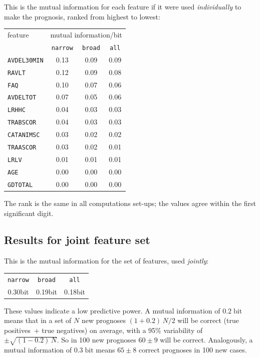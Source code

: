 \documentclass[\ifafour a4paper,12pt,\else a5paper,10pt,\fi%
onecolumn,oneside,article,%
british%
]{memoir}
\theoremstyle{remark}
\theoremstyle{innote}
\renewcommand*{\|}[1][]{\nonscript\:#1\vert\nonscript\:\mathopen{}}
\newcommand*{\bit}{\textrm{bit}}
\newcommand*{\narrow}{\texttt{narrow}}
\newcommand*{\broad}{\texttt{broad}}
\newcommand*{\all}{\texttt{all}}
\begin{document}
This is the mutual information for each feature if it were used
\emph{individually} to make the prognosis, ranked
from highest to lowest:
\begin{center}
  \begin{tabular}[c]{l|ccc}
    feature &\multicolumn{3}{c}{mutual information/bit} \\
    & \narrow & \broad & \all \\
\hline
    \texttt{AVDEL30MIN} & 0.13 & 0.09 & 0.09\\
    \texttt{RAVLT} & 0.12 & 0.09 & 0.08\\
    \texttt{FAQ} & 0.10 & 0.07 & 0.06\\
    \texttt{AVDELTOT} & 0.07 & 0.05 & 0.06\\
    \texttt{LRHHC} & 0.04 & 0.03 & 0.03\\
    \texttt{TRABSCOR} & 0.04 & 0.03 & 0.03\\
    \texttt{CATANIMSC} & 0.03 & 0.02 & 0.02\\
    \texttt{TRAASCOR} & 0.03 & 0.02 & 0.01\\
    \texttt{LRLV} & 0.01 & 0.01 & 0.01\\
    \texttt{AGE} & 0.00 & 0.00 & 0.00\\
    \texttt{GDTOTAL} & 0.00 & 0.00 & 0.00
  \end{tabular}                            
\end{center}
The rank is the same in all computations set-ups; the values agree within
the first significant digit.

\subsection{Results for joint feature set}
\label{sec:joint}

This is the mutual information for the set of features, used \emph{jointly}:
\begin{center}
  \begin{tabular}[c]{ccc}
    \narrow & \broad & \all \\
    0.30\;\bit & 0.19\;\bit & 0.18\;bit
  \end{tabular}
\end{center}
These values indicate a low predictive power. A mutual information of
$0.2\;\bit$ means that in a set of $N$ new prognoses $(1+0.2)\,N/2$ will be
correct (true positives~+ true negatives) on average, with a 95\%
variability of $\pm \sqrt{(1-0.2)\,N}$. So in 100 new prognoses $60\pm 9$
will be correct. Analogously, a mutual information of $0.3\;\bit$ means
$65\pm 8$ correct prognoses in 100 new cases.
\end{document}
